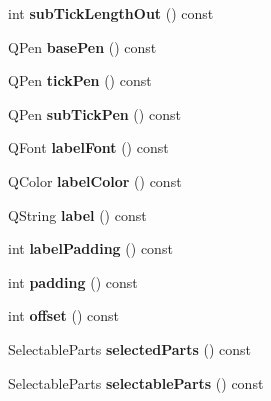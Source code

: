 \begin{DoxyCompactItemize}
int {\bfseries sub\+Tick\+Length\+Out} () const
\item 
\mbox{\label{class_q_c_p_axis_a216974be018e73008b3cf6d033c1325d}} 
Q\+Pen {\bfseries base\+Pen} () const
\item 
\mbox{\label{class_q_c_p_axis_affd022d4f56dfc575b4ced95ad417860}} 
Q\+Pen {\bfseries tick\+Pen} () const
\item 
\mbox{\label{class_q_c_p_axis_a7a89df74ba427fac311bf4cc92fbddca}} 
Q\+Pen {\bfseries sub\+Tick\+Pen} () const
\item 
\mbox{\label{class_q_c_p_axis_aa7b465fe233f1878793954ba5ab9c47e}} 
Q\+Font {\bfseries label\+Font} () const
\item 
\mbox{\label{class_q_c_p_axis_a05794f13d322da7fd9d5554d11186b0e}} 
Q\+Color {\bfseries label\+Color} () const
\item 
\mbox{\label{class_q_c_p_axis_a32ba4d3effcddd8af3bc49f405e1d53e}} 
Q\+String {\bfseries label} () const
\item 
\mbox{\label{class_q_c_p_axis_a6d9a9fe1c7166f209fb1e25686390451}} 
int {\bfseries label\+Padding} () const
\item 
\mbox{\label{class_q_c_p_axis_a07df379d5c017b8f3a4702532eb037b2}} 
int {\bfseries padding} () const
\item 
\mbox{\label{class_q_c_p_axis_aef66fa16353b4993b1cceabfb644a1a9}} 
int {\bfseries offset} () const
\item 
\mbox{\label{class_q_c_p_axis_a893e8d6cfed9267eb2b793cb1d2b4dce}} 
Selectable\+Parts {\bfseries selected\+Parts} () const
\item 
\mbox{\label{class_q_c_p_axis_a1d12d157756c114f4e57517c62177181}} 
Selectable\+Parts {\bfseries selectable\+Parts} () const
\item 
\mbox{\label{class_q_c_p_axis_a09817512bef8ddfb669a6828f9c855bc}} 

\end{DoxyCompactItemize}
